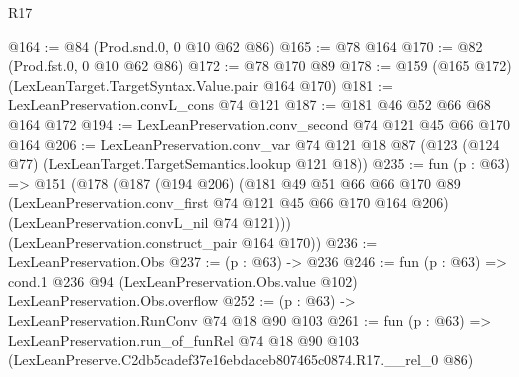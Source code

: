 \begin{lexlean}{R17}
\begin{coremodule}
@164 := @84 (Prod.snd.{0, 0} @10 @62 @86)
@165 := @78 @164
@170 := @82 (Prod.fst.{0, 0} @10 @62 @86)
@172 := @78 @170 @89
@178 := @159 (@165 @172) (LexLeanTarget.TargetSyntax.Value.pair @164 @170)
@181 := LexLeanPreservation.convL_cons @74 @121
@187 := @181 @46 @52 @66 @68 @164 @172
@194 := LexLeanPreservation.conv_second @74 @121 @45 @66 @170 @164
@206 := LexLeanPreservation.conv_var
    @74
    @121
    @18
    @87
    (@123 (@124 @77) (LexLeanTarget.TargetSemantics.lookup @121 @18))
@235 := fun (p : @63) =>
  @151
    (@178
      (@187
        (@194 @206)
        (@181
          @49
          @51
          @66
          @66
          @170
          @89
          (LexLeanPreservation.conv_first @74 @121 @45 @66 @170 @164 @206)
          (LexLeanPreservation.convL_nil @74 @121)))
      (LexLeanPreservation.construct_pair @164 @170))
@236 := LexLeanPreservation.Obs
@237 := (p : @63) -> @236
@246 := fun (p : @63) =>
  cond.{1} @236 @94 (LexLeanPreservation.Obs.value @102) LexLeanPreservation.Obs.overflow
@252 := (p : @63) -> LexLeanPreservation.RunConv @74 @18 @90 @103
@261 := fun (p : @63) =>
  LexLeanPreservation.run_of_funRel
    @74
    @18
    @90
    @103
    (LexLeanPreserve.C2db5cadef37e16ebdaceb807465c0874.R17.__rel_0 @86)
\end{coremodule}
\end{lexlean}
